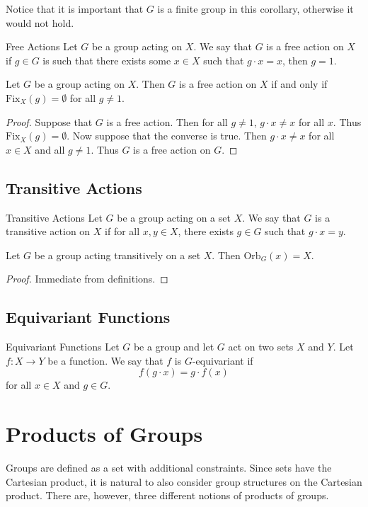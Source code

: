 \documentclass[a4paper]{article}
\begin{document}
Notice that it is important that $G$ is a finite group in this corollary, otherwise it would not hold. 

\begin{defn}{Free Actions}{} Let $G$ be a group acting on $X$. We say that $G$ is a free action on $X$ if $g\in G$ is such that there exists some $x\in X$ such that $g\cdot x=x$, then $g=1$. 
\end{defn}

\begin{lmm}{}{} Let $G$ be a group acting on $X$. Then $G$ is a free action on $X$ if and only if $\text{Fix}_X(g)=\emptyset$ for all $g\neq 1$. 
\begin{proof}
Suppose that $G$ is a free action. Then for all $g\neq 1$, $g\cdot x\neq x$ for all $x$. Thus $\text{Fix}_X(g)=\emptyset$. Now suppose that the converse is true. Then $g\cdot x\neq x$ for all $x\in X$ and all $g\neq 1$. Thus $G$ is a free action on $G$. 
\end{proof}
\end{lmm}

\subsection{Transitive Actions}
\begin{defn}{Transitive Actions}{} Let $G$ be a group acting on a set $X$. We say that $G$ is a transitive action on $X$ if for all $x,y\in X$, there exists $g\in G$ such that $g\cdot x=y$. 
\end{defn}

\begin{lmm}{}{} Let $G$ be a group acting transitively on a set $X$. Then $\text{Orb}_G(x)=X$. 
\begin{proof}
Immediate from definitions. 
\end{proof}
\end{lmm}

\subsection{Equivariant Functions}
\begin{defn}{Equivariant Functions}{} Let $G$ be a group and let $G$ act on two sets $X$ and $Y$. Let $f:X\to Y$ be a function. We say that $f$ is $G$-equivariant if $$f(g\cdot x)=g\cdot f(x)$$ for all $x\in X$ and $g\in G$. 
\end{defn}

\pagebreak
\section{Products of Groups}
Groups are defined as a set with additional constraints. Since sets have the Cartesian product, it is natural to also consider group structures on the Cartesian product. There are, however, three different notions of products of groups. 
\end{document}
